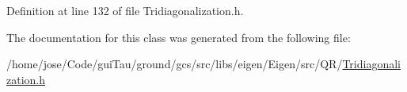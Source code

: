 Definition at line 132 of file Tridiagonalization.\-h.



The documentation for this class was generated from the following file\-:\begin{DoxyCompactItemize}
\item 
/home/jose/\-Code/gui\-Tau/ground/gcs/src/libs/eigen/\-Eigen/src/\-Q\-R/\hyperlink{_tridiagonalization_8h}{Tridiagonalization.\-h}\end{DoxyCompactItemize}
